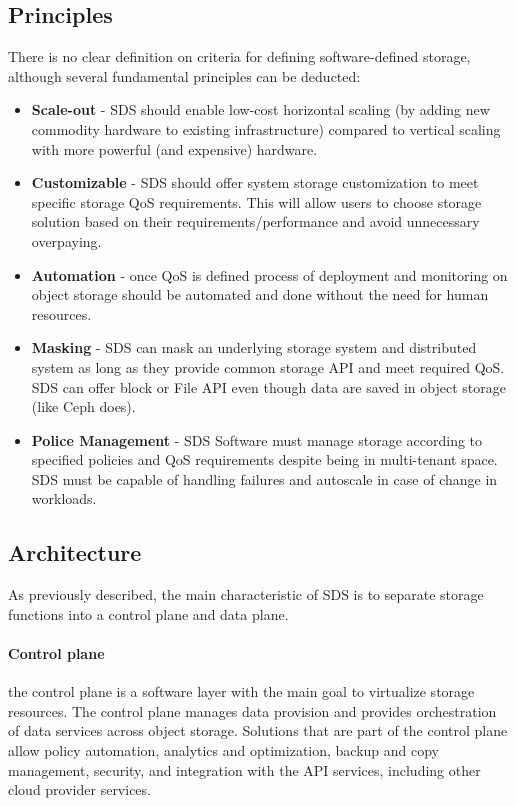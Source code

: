     \subsection*{Principles}
    There is no clear definition on criteria for defining software-defined storage, although several fundamental principles can be deducted\cite{sdsGPCloudStorage}:
    \begin{itemize}
        \item \textbf{Scale-out} - SDS should enable low-cost horizontal scaling (by adding new commodity hardware to existing infrastructure) compared to vertical scaling with more powerful (and expensive) hardware.
        \item \textbf{Customizable} - SDS should offer system storage customization to meet specific storage QoS requirements. This will allow users to choose storage solution based on their requirements/performance and avoid unnecessary overpaying.
        \item \textbf{Automation} - once QoS is defined process of deployment and monitoring on object storage should be automated and done without the need for human resources.
        \item \textbf{Masking} - SDS can mask an underlying storage system and distributed system as long as they provide common storage API and meet required QoS. SDS can offer block or File API even though data are saved in object storage (like Ceph does).
        \item \textbf{Police Management} - SDS Software must manage storage according to specified policies and QoS requirements despite being in multi-tenant space. SDS must be capable of handling failures and autoscale in case of change in workloads.
    \end{itemize}


    \subsection*{Architecture}
    As previously described, the main characteristic of SDS is to separate storage functions into a control plane and data plane.

    \paragraph{Control plane}
    the control plane is a software layer with the main goal to virtualize storage resources. The control plane manages data provision and provides orchestration of data services across object storage. Solutions that are part of the control plane allow policy automation, analytics and optimization, backup and copy management, security, and integration with the API services, including other cloud provider services\cite{sdsIBMSDSGuide}.

